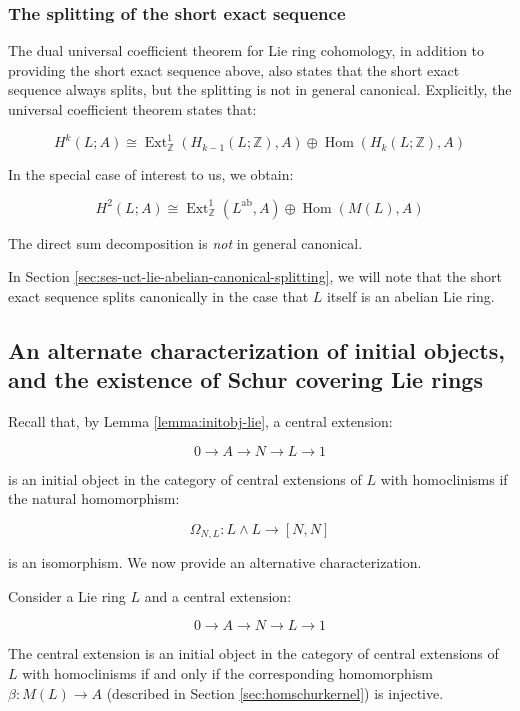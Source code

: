 \documentclass{ucetd}
\begin{document}
\subsubsection{The splitting of the short exact sequence}

The dual universal coefficient theorem for Lie ring cohomology, in addition
to providing the short exact sequence above, also states that the
short exact sequence always splits, but the splitting is not in
general canonical. Explicitly, the universal coefficient theorem
states that:

$$H^k(L;A) \cong \operatorname{Ext}^1_{\mathbb{Z}}(H_{k-1}(L;\mathbb{Z}),A) \oplus \operatorname{Hom}(H_k(L;\mathbb{Z}),A)$$

In the special case of interest to us, we obtain:

$$H^2(L;A) \cong \operatorname{Ext}^1_{\mathbb{Z}}(L^{\operatorname{ab}},A) \oplus \operatorname{Hom}(M(L),A)$$

The direct sum decomposition is {\em not} in general canonical. %

In Section \ref{sec:ses-uct-lie-abelian-canonical-splitting}, we will note that the
short exact sequence splits canonically in the case that $L$ itself is
an abelian Lie ring.

\subsection{An alternate characterization of initial objects, and the existence of Schur covering Lie rings}

Recall that, by Lemma \ref{lemma:initobj-lie}, a central extension:

$$0 \to A \to N \to L \to 1$$

is an initial object in the category of central extensions of $L$ with
homoclinisms if the natural homomorphism:

$$\Omega_{N,L}: L \wedge L \to [N,N]$$

is an isomorphism. We now provide an alternative characterization.

\begin{lemma}\label{lemma:initial-beta-injective-lie}
  Consider a Lie ring $L$ and a central extension:

  $$0 \to A \to N \to L \to 1$$

  The central extension is an initial object in the category of
  central extensions of $L$ with homoclinisms if and only if the
  corresponding homomorphism $\beta:M(L) \to A$ (described in Section
  \ref{sec:homschurkernel}) is injective.
\end{lemma}
\end{document}
